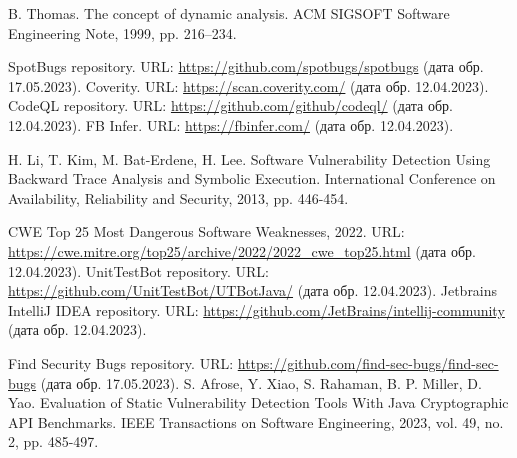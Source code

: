 \documentclass[a4paper,article,14pt]{extarticle}
\begin{document}


\tableofcontents
\pagebreak










\begin{thebibliography}{1}
 B. Thomas. The concept of dynamic analysis. ACM SIGSOFT Software Engineering Note, 1999, pp. 216–234.

 SpotBugs repository. URL: \url{https://github.com/spotbugs/spotbugs} (дата обр. 17.05.2023).
 Coverity. URL: \url{https://scan.coverity.com/} (дата обр. 12.04.2023).
 CodeQL repository. URL: \url{https://github.com/github/codeql/} (дата обр. 12.04.2023).
 FB Infer. URL: \url{https://fbinfer.com/} (дата обр. 12.04.2023).

 H. Li, T. Kim, M. Bat-Erdene, H. Lee. Software Vulnerability Detection Using Backward Trace Analysis and Symbolic Execution. International Conference on Availability, Reliability and Security, 2013, pp. 446-454.


 CWE Top 25 Most Dangerous Software Weaknesses, 2022. URL: \url{https://cwe.mitre.org/top25/archive/2022/2022_cwe_top25.html} (дата обр. 12.04.2023).
 UnitTestBot repository. URL: \url{https://github.com/UnitTestBot/UTBotJava/} (дата обр. 12.04.2023).
 Jetbrains IntelliJ IDEA repository. URL: \url{https://github.com/JetBrains/intellij-community} (дата обр. 12.04.2023).


 Find Security Bugs repository. URL: \url{https://github.com/find-sec-bugs/find-sec-bugs} (дата обр. 17.05.2023).
 S. Afrose, Y. Xiao, S. Rahaman, B. P. Miller, D. Yao. Evaluation of Static Vulnerability Detection Tools With Java Cryptographic API Benchmarks. IEEE Transactions on Software Engineering, 2023, vol. 49, no. 2, pp. 485-497.


\end{thebibliography}
\end{document}

